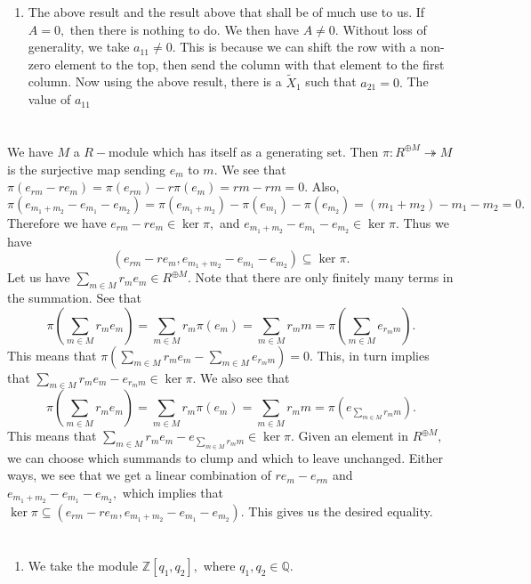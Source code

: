 \documentclass{article}
\begin{document}
\begin{enumerate}
	\item The above result and the result above that shall be of much use to us. If $A=0,$ then there is nothing to do. We then have $A\neq 0.$ Without loss 
	of generality, we take $a_{11}\neq 0.$ This is because we can shift the row with a non-zero element to the top, then send the column with that element 
	to the first column. Now using the above result, there is a $\tilde{X}_1$ such that $a_{21}=0.$ The value of $a_{11}$
\end{enumerate}
 
\section{} %
\section{} %
We have $M$ a $R-$module which has itself as a generating set. Then $\pi: R^{\oplus M}\twoheadrightarrow M$ is the surjective map sending $e_m$ to $m.$ We 
see that $\pi(e_{rm}-re_m)=\pi(e_{rm})-r\pi(e_m)=rm-rm=0.$ Also, $\pi(e_{m_1+m_2}-e_{m_1}-e_{m_2})=\pi(e_{m_1+m_2})-\pi(e_{m_1})-\pi(e_{m_2})= 
(m_1+m_2)-m_1-m_2=0.$ Therefore we have $ e_{rm}-re_m \in \ker \pi, $ and $e_{m_1+m_2}-e_{m_1}-e_{m_2} \in \ker \pi.$ Thus we have 
$$(e_{rm}-re_m,e_{m_1+m_2}-e_{m_1}-e_{m_2}) \subseteq \ker \pi.$$ Let us have $\sum_{m \in M}r_m e_m \in R^{\oplus M}.$ Note that there are only finitely 
many 
terms in the summation. See that $$\pi(\sum_{m \in M}r_m e_m)=\sum_{m \in M}r_m \pi(e_m)= \sum_{m \in M}r_m m = \pi(\sum_{m \in M}e_{r_mm}).$$ This means 
that 
$\pi(\sum_{m \in M}r_m e_m - \sum_{m \in M}e_{r_mm})=0.$ This, in turn implies that $ \sum_{m \in M} r_me_m - e_{r_mm} \in \ker \pi.$ We also see that 
$$\pi(\sum_{m \in M}r_m e_m)=\sum_{m \in M}r_m \pi(e_m)= \sum_{m \in M}r_m m = \pi(e_{\sum_{m \in M}r_mm}).$$ This means that $\sum_{m \in M}r_m 
e_m-e_{\sum_{m \in M}r_mm} \in \ker \pi.$ Given an element in $R^{\oplus M},$ we can choose which summands to clump and which to leave unchanged. Either 
ways, we see that we get a linear combination of $re_m-e_{rm}$ and $e_{m_1+m_2}-e_{m_1}-e_{m_2},$ which implies that $ \ker \pi \subseteq 
(e_{rm}-re_m,e_{m_1+m_2}-e_{m_1}-e_{m_2}).$ This gives us the desired equality.
\section{} %
\begin{enumerate}
	\item We take the module $\mathbb{Z}[q_1,q_2],$ where $q_1,q_2 \in \mathbb{Q}.$ 
\end{enumerate}
\section{} %
\section{} %
\end{document}
